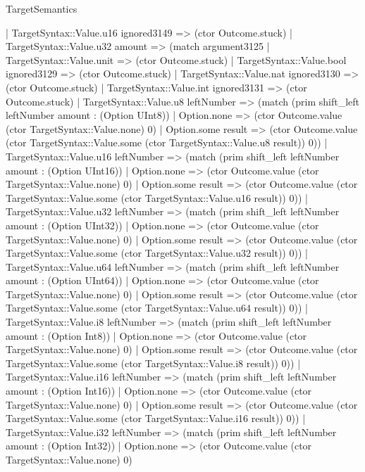 \begin{lexlean}{TargetSemantics}
\begin{semanticmodule}
{            | TargetSyntax::Value.u16 ignored3149 => (ctor Outcome.stuck)
            | TargetSyntax::Value.u32 amount => (match argument3125
              | TargetSyntax::Value.unit => (ctor Outcome.stuck)
              | TargetSyntax::Value.bool ignored3129 => (ctor Outcome.stuck)
              | TargetSyntax::Value.nat ignored3130 => (ctor Outcome.stuck)
              | TargetSyntax::Value.int ignored3131 => (ctor Outcome.stuck)
              | TargetSyntax::Value.u8 leftNumber => (match (prim shift_left leftNumber amount : (Option UInt8))
                | Option.none => (ctor Outcome.value (ctor TargetSyntax::Value.none) 0)
                | Option.some result => (ctor Outcome.value (ctor TargetSyntax::Value.some (ctor TargetSyntax::Value.u8 result)) 0))
              | TargetSyntax::Value.u16 leftNumber => (match (prim shift_left leftNumber amount : (Option UInt16))
                | Option.none => (ctor Outcome.value (ctor TargetSyntax::Value.none) 0)
                | Option.some result => (ctor Outcome.value (ctor TargetSyntax::Value.some (ctor TargetSyntax::Value.u16 result)) 0))
              | TargetSyntax::Value.u32 leftNumber => (match (prim shift_left leftNumber amount : (Option UInt32))
                | Option.none => (ctor Outcome.value (ctor TargetSyntax::Value.none) 0)
                | Option.some result => (ctor Outcome.value (ctor TargetSyntax::Value.some (ctor TargetSyntax::Value.u32 result)) 0))
              | TargetSyntax::Value.u64 leftNumber => (match (prim shift_left leftNumber amount : (Option UInt64))
                | Option.none => (ctor Outcome.value (ctor TargetSyntax::Value.none) 0)
                | Option.some result => (ctor Outcome.value (ctor TargetSyntax::Value.some (ctor TargetSyntax::Value.u64 result)) 0))
              | TargetSyntax::Value.i8 leftNumber => (match (prim shift_left leftNumber amount : (Option Int8))
                | Option.none => (ctor Outcome.value (ctor TargetSyntax::Value.none) 0)
                | Option.some result => (ctor Outcome.value (ctor TargetSyntax::Value.some (ctor TargetSyntax::Value.i8 result)) 0))
              | TargetSyntax::Value.i16 leftNumber => (match (prim shift_left leftNumber amount : (Option Int16))
                | Option.none => (ctor Outcome.value (ctor TargetSyntax::Value.none) 0)
                | Option.some result => (ctor Outcome.value (ctor TargetSyntax::Value.some (ctor TargetSyntax::Value.i16 result)) 0))
              | TargetSyntax::Value.i32 leftNumber => (match (prim shift_left leftNumber amount : (Option Int32))
                | Option.none => (ctor Outcome.value (ctor TargetSyntax::Value.none) 0)
}
\end{semanticmodule}
\end{lexlean}
